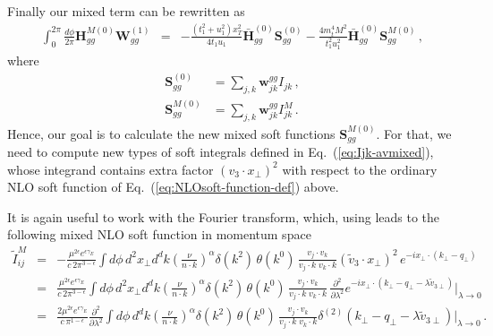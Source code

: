 \documentclass[a4paper,11pt]{report}
\numberwithin{equation}{section}
\newcommand{\mixed}{{M}}
\newcommand{\bfS}{\bm{S}}
\begin{document}
Finally our mixed term can be rewritten as
%
\begin{eqnarray}
  \int_0^{2\pi} \frac{d\phi}{2\pi}
  \bm{H}^{M(0)}_{gg}\bm{W}^{(1)}_{gg}
  & = &
  -\frac{(t_1^2+u_1^2) x_T^2}{4 t_1 u_1} 
  \bm{\bar H}_{gg}^{(0)} 
  \bfS_{gg}^{(0)}
  - \frac{4 m_t^4 M^2 }{t_1^2 u_1^2} 
  \bm{\bar H}_{gg}^{(0)} 
  \bfS_{gg}^{M(0)}\,,
  \label{eq:mixed-integral-av}
\end{eqnarray}
%
where
%
\begin{subequations}
  \begin{align}
  \bfS_{gg}^{(0)} & =
  \sum_{j,k} \bm{w}^{gg}_{jk} I_{jk}\,,
  \\
  \bfS_{gg}^{M(0)} & =
  \sum_{j,k} \bm{w}^{gg}_{jk} I^\mixed_{jk}\,.
  \label{eq:SMgg-wgg}
  \end{align}
\end{subequations}
%
Hence, our goal is to calculate the new mixed soft functions
$\bfS_{gg}^{M(0)}$.
%
For that, we need to compute new types of soft integrals defined in
Eq.~(\ref{eq:Ijk-avmixed}), whose
integrand contains extra factor $(v_3 \cdot x_\perp )^2$ with respect to the
ordinary NLO soft function of Eq.~(\ref{eq:NLOsoft-function-def}) above. 

It is again useful to work with the Fourier transform, which, 
using
leads to the following mixed NLO soft function in momentum space
%
\begin{eqnarray}
  \tilde I_{ij}^\mixed
  & =  &
  -\frac{\mu^{2\epsilon} e^{\epsilon \gamma_E}}{c\, 2\pi^{3-\epsilon}}
  \int\!\! d\phi\, d^2 x_\perp d^d k
  \left(\frac{\nu}{n\cdot k}\right)^\alpha
  \delta(k^2)\, \theta(k^0)\,
  \frac{v_j \cdot v_k}{v_j \cdot k\; v_k \cdot k}
  (\tilde v_3 \cdot x_\perp)^2\,
  e^{-i x_\perp \cdot (k_\perp-q_\perp)}
  \nonumber \\
  & =  &
  \frac{\mu^{2\epsilon} e^{\epsilon \gamma_E}}{c\, 2\pi^{3-\epsilon}}
  \int\!\! d\phi\, d^2 x_\perp d^d k
  \left(\frac{\nu}{n\cdot k}\right)^\alpha
  \delta(k^2)\, \theta(k^0)\,
  \frac{v_j \cdot v_k}{v_j \cdot k\; v_k \cdot k}\,
  \frac{\partial^2}{\partial \lambda^2}
  e^{-i x_\perp \cdot (k_\perp-q_\perp-\lambda \tilde v_{3\perp})}
  \bigg |_{\lambda \to 0}
  \nonumber \\
  & =  &
  \frac{2\mu^{2\epsilon} e^{\epsilon \gamma_E}}{c\, \pi^{1-\epsilon}}
  \frac{\partial^2}{\partial \lambda^2}
  \int\!\! d\phi\, d^d k
  \left(\frac{\nu}{n\cdot k}\right)^\alpha
  \delta(k^2)\, \theta(k^0)\,
  \frac{v_j \cdot v_k}{v_j \cdot k\; v_k \cdot k}
  \delta^{(2)} (k_\perp-q_\perp-\lambda \tilde v_{3\perp})
  \bigg |_{\lambda \to 0}\,.
  \label{eq:lambda-trick-deriv}
\end{eqnarray}
\end{document}
